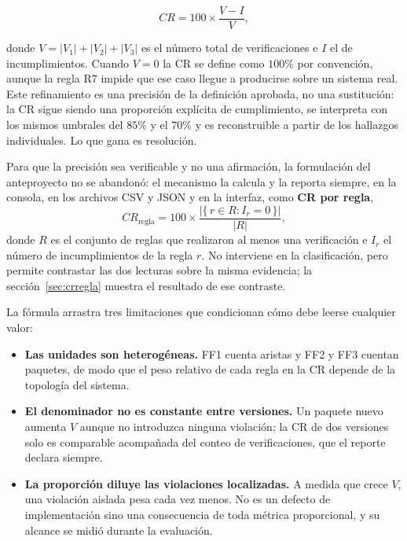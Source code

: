 \begin{equation}
CR = 100 \times \frac{V - I}{V},
\label{eq:cr}
\end{equation}

\noindent donde $V = |V_1| + |V_2| + |V_3|$ es el número total de verificaciones e $I$ el de incumplimientos. Cuando $V = 0$ la CR se define como $100\%$ por convención, aunque la regla R7 impide que ese caso llegue a producirse sobre un sistema real. Este refinamiento es una precisión de la definición aprobada, no una sustitución: la CR sigue siendo una proporción explícita de cumplimiento, se interpreta con los mismos umbrales del $85\%$ y el $70\%$ y es reconstruible a partir de los hallazgos individuales. Lo que gana es resolución.

Para que la precisión sea verificable y no una afirmación, la formulación del anteproyecto no se abandonó: el mecanismo la calcula y la reporta siempre, en la consola, en los archivos CSV y JSON y en la interfaz, como \textbf{CR por regla},
\begin{equation}
CR_{\text{regla}} = 100 \times \frac{|\{\,r \in R : I_r = 0\,\}|}{|R|},
\label{eq:crregla}
\end{equation}
\noindent donde $R$ es el conjunto de reglas que realizaron al menos una verificación e $I_r$ el número de incumplimientos de la regla $r$. No interviene en la clasificación, pero permite contrastar las dos lecturas sobre la misma evidencia; la sección~\ref{sec:crregla} muestra el resultado de ese contraste.

La fórmula arrastra tres limitaciones que condicionan cómo debe leerse cualquier valor:

\begin{itemize}
    \item \textbf{Las unidades son heterogéneas.} FF1 cuenta aristas y FF2 y FF3 cuentan paquetes, de modo que el peso relativo de cada regla en la CR depende de la topología del sistema.
    \item \textbf{El denominador no es constante entre versiones.} Un paquete nuevo aumenta $V$ aunque no introduzca ninguna violación; la CR de dos versiones solo es comparable acompañada del conteo de verificaciones, que el reporte declara siempre.
    \item \textbf{La proporción diluye las violaciones localizadas.} A medida que crece $V$, una violación aislada pesa cada vez menos. No es un defecto de implementación sino una consecuencia de toda métrica proporcional, y su alcance se midió durante la evaluación.
\end{itemize}

